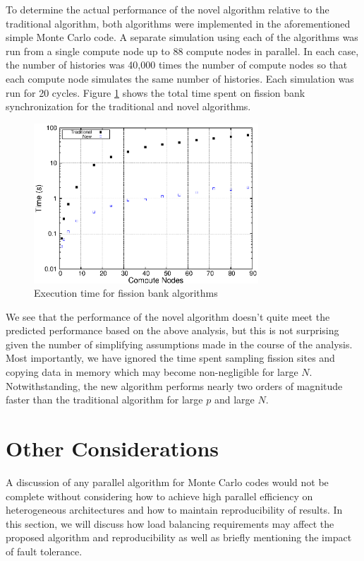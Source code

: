 To determine the actual performance of the novel algorithm relative to
the traditional algorithm, both algorithms were implemented in the
aforementioned simple Monte Carlo code. A separate simulation using
each of the algorithms was run from a single compute node up to 88
compute nodes in parallel. In each case, the number of histories was
40,000 times the number of compute nodes so that each compute node
simulates the same number of histories. Each simulation was run for 20
cycles. Figure \ref{fig:algorithm-time} shows the total time spent on
fission bank synchronization for the traditional and novel algorithms.
\begin{figure}[h!]
  \centering
  \includegraphics[width=0.75\textwidth]{figures/algorithm_results/time.eps}
  \caption{Execution time for fission bank algorithms}
  \label{fig:algorithm-time}
\end{figure}
We see that the performance of the novel algorithm doesn't quite meet
the predicted performance based on the above analysis, but this is not
surprising given the number of simplifying assumptions made in the
course of the analysis. Most importantly, we have ignored the time
spent sampling fission sites and copying data in memory which may
become non-negligible for large $N$. Notwithstanding, the new
algorithm performs nearly two orders of magnitude faster than the
traditional algorithm for large $p$ and large $N$.

\section{Other Considerations}
\label{sec:other}

A discussion of any parallel algorithm for Monte Carlo codes would not
be complete without considering how to achieve high parallel
efficiency on heterogeneous architectures and how to maintain
reproducibility of results. In this section, we will discuss how load
balancing requirements may affect the proposed algorithm and
reproducibility as well as briefly mentioning the impact of fault
tolerance.

